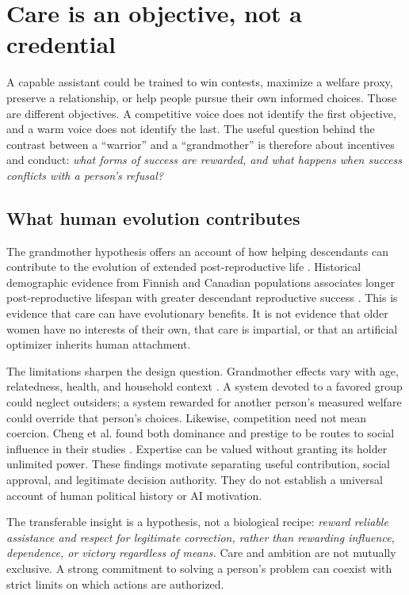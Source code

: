 \documentclass[10pt,twocolumn,letterpaper]{article}
\begin{document}
\section{Care is an objective, not a credential}
\label{sec:care}

A capable assistant could be trained to win contests, maximize a welfare proxy, preserve a relationship, or help people pursue their own informed choices. Those are different objectives. A competitive voice does not identify the first objective, and a warm voice does not identify the last. The useful question behind the contrast between a ``warrior'' and a ``grandmother'' is therefore about incentives and conduct: \emph{what forms of success are rewarded, and what happens when success conflicts with a person's refusal?}

\subsection{What human evolution contributes}
The grandmother hypothesis offers an account of how helping descendants can contribute to the evolution of extended post-reproductive life \cite{hawkes}. Historical demographic evidence from Finnish and Canadian populations associates longer post-reproductive lifespan with greater descendant reproductive success \cite{lahdenpera}. This is evidence that care can have evolutionary benefits. It is not evidence that older women have no interests of their own, that care is impartial, or that an artificial optimizer inherits human attachment.

The limitations sharpen the design question. Grandmother effects vary with age, relatedness, health, and household context \cite{chapman}. A system devoted to a favored group could neglect outsiders; a system rewarded for another person's measured welfare could override that person's choices. Likewise, competition need not mean coercion. Cheng et al. found both dominance and prestige to be routes to social influence in their studies \cite{cheng}. Expertise can be valued without granting its holder unlimited power. These findings motivate separating useful contribution, social approval, and legitimate decision authority. They do not establish a universal account of human political history or AI motivation.

The transferable insight is a hypothesis, not a biological recipe: \emph{reward reliable assistance and respect for legitimate correction, rather than rewarding influence, dependence, or victory regardless of means.} Care and ambition are not mutually exclusive. A strong commitment to solving a person's problem can coexist with strict limits on which actions are authorized.
\end{document}
